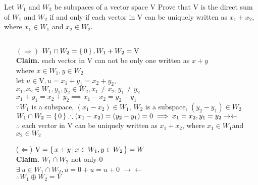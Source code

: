 Let $W_1$ and $W_2$ be subspaces of a vector space $\mathrm{V}$ Prove that $\mathrm{V}$ is the direct sum of $W_1$ and $W_2$ if and only if each vector in $\mathrm{V}$ can be uniquely written as $x_1 + x_2$, where $x_1 \in W_1$ and $x_2 \in W_2$.

\begin{tcolorbox}
	\begin{solution}$ $
		\begin{enumerate}
			\item[$(\Rightarrow)$] $W_1 \cap W_2 = \left\{ \,0 \,\right\}, W_1 + W_2 = \mathrm{V}$\\
			\textbf{Claim.} each vector in V can not be only one written as $x + y$ \\where $x \in W_1, y \in W_2$\\
			let  $u \in \mathrm{V}, u = x_1 + y_1 = x_2 + y_2, $\\$x_1,x_2 \in W_1, y_1,y_2 \in W_2,x_1 \neq x_2, y_1 \neq y_2$\\
			$x_1 + y_1 = x_2 + y_2 \implies x_1 - x_2 = y_2 - y_1$\\
			$\because W_1$ is a subspace, $(x_1 - x_2) \in W_1 $,
			$W_2$ is a subspace, $(y_2 - y_1) \in W_2$
			$W_1 \cap W_2 = \left\{ \,0 \,\right\} \therefore (x_1-x_2) = (y_2 - y_1) = 0 \implies x_1 = x_2, y_1 = y_2 \rightarrow\leftarrow$\\
			$\therefore$ each vector in V can be uniquely written as $x_1 + x_2$, where $x_1 \in W_1$and $x_2 \in W_2$
			\item[($\Leftarrow$)] $\mathrm{V} = \left\{ \,x+y \,|\, x \in W_1 ,y \in W_2 \,\right\} = W$\\
			\textbf{Claim.} $W_1 \cap W_2$ not only $0$\\
			$\exists~ u \in W_1 \cap W_2, u=0+u = u+0$ $ \rightarrow \leftarrow$\\
			$\therefore W_1 \oplus W_2 = V$
		\end{enumerate}
	\end{solution}
\end{tcolorbox}
